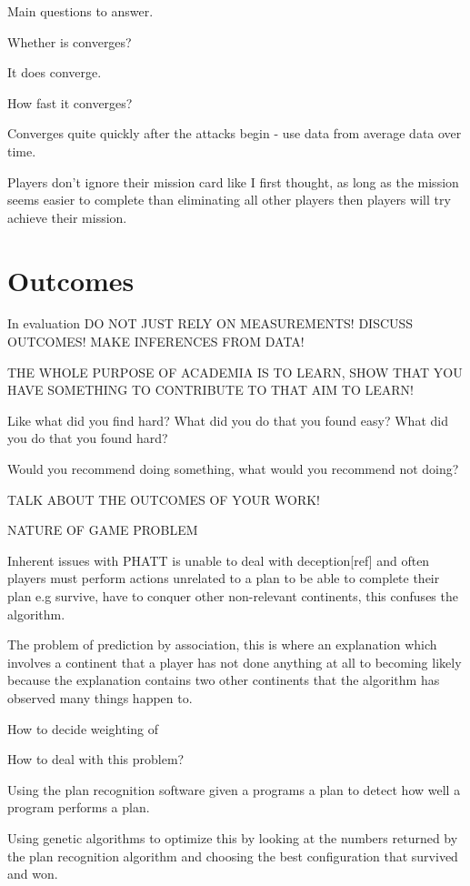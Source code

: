 \documentclass[parskip]{cs4rep}
\begin{document}
Main questions to answer.

Whether is converges?

It does converge.

How fast it converges?

Converges quite quickly after the attacks begin - use data from average data over time.

Players don't ignore their mission card like I first thought, as long as the mission seems easier to complete than eliminating all other players then players will try achieve their mission.

\section{Outcomes}

In evaluation DO NOT JUST RELY ON MEASUREMENTS! DISCUSS OUTCOMES! MAKE INFERENCES FROM DATA!

THE WHOLE PURPOSE OF ACADEMIA IS TO LEARN, SHOW THAT YOU HAVE SOMETHING TO CONTRIBUTE TO THAT AIM TO LEARN!

Like what did you find hard? What did you do that you found easy? What did you do that you found hard? 

Would you recommend doing something, what would you recommend not doing?

TALK ABOUT THE OUTCOMES OF YOUR WORK!

NATURE OF GAME PROBLEM

Inherent issues with PHATT is unable to deal with deception[ref] and often players must perform actions unrelated to a plan to be able to complete their plan e.g survive, have to conquer other non-relevant continents, this confuses the algorithm.

The problem of prediction by association, this is where an explanation which involves a continent that a player has not done anything at all to becoming likely because the explanation contains two other continents that the algorithm has observed many things happen to.

How to decide weighting of 

How to deal with this problem?

Using the plan recognition software given a programs a plan to detect how well a program performs a plan. 

Using genetic algorithms to optimize this by looking at the numbers returned by the plan recognition algorithm and choosing the best configuration that survived and won.
\end{document}
